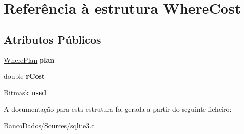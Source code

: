 \hypertarget{struct_where_cost}{\section{Referência à estrutura Where\-Cost}
\label{struct_where_cost}
}
\subsection*{Atributos Públicos}
\begin{DoxyCompactItemize}
\item 
\hypertarget{struct_where_cost_ace6ca770eb1f123bcbf2ce6433e69822}{\hyperlink{struct_where_plan}{Where\-Plan} {\bfseries plan}}\label{struct_where_cost_ace6ca770eb1f123bcbf2ce6433e69822}

\item 
\hypertarget{struct_where_cost_a4dba436b417d0d562e0a32519befa824}{double {\bfseries r\-Cost}}\label{struct_where_cost_a4dba436b417d0d562e0a32519befa824}

\item 
\hypertarget{struct_where_cost_ab041bae4d0f6cc76f427c82d3840bfae}{Bitmask {\bfseries used}}\label{struct_where_cost_ab041bae4d0f6cc76f427c82d3840bfae}

\end{DoxyCompactItemize}


A documentação para esta estrutura foi gerada a partir do seguinte ficheiro\-:\begin{DoxyCompactItemize}
\item 
Banco\-Dados/\-Sources/sqlite3.\-c\end{DoxyCompactItemize}
